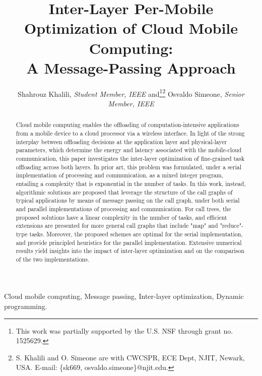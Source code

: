 \documentclass[journal,twocolumn,10pt,twoside]{IEEEtranTCOM}
\theoremstyle{plain}
\theoremstyle{plain}
\theoremstyle{remark}
\begin{document}
\title{Inter-Layer Per-Mobile Optimization of Cloud Mobile Computing: \protect\\ A Message-Passing Approach}


\author{Shahrouz Khalili, \emph{Student Member, IEEE} and\thanks{This work was partially supported by the U.S. NSF through grant no. 1525629.}\thanks{S. Khalili and  O. Simeone are with CWCSPR, ECE Dept, NJIT, Newark, USA. E-mail: \{sk669, osvaldo.simeone\}@njit.edu.} Osvaldo Simeone, \emph{Senior Member, IEEE}}

\maketitle
\vspace{-1in}

\begin{abstract}
Cloud mobile computing enables the offloading of computation-intensive applications from a mobile device to a cloud processor via a wireless interface. In light of the strong interplay between offloading decisions at the application layer and physical-layer parameters, which determine the energy and latency associated with the mobile-cloud communication, this paper investigates the inter-layer optimization of fine-grained task offloading across both layers. In prior art, this problem was formulated, under a serial implementation of processing and communication, as a mixed integer program, entailing a complexity that is exponential in the number of tasks. In this work, instead, algorithmic solutions are proposed that leverage the structure of the call graphs of typical applications by means of message passing on the call graph, under both serial and parallel implementations of processing and communication. For call trees, the proposed solutions have a linear complexity in the number of tasks, and efficient extensions are presented for more general call graphs that include "map" and "reduce"-type tasks. Moreover, the proposed schemes are optimal for the serial implementation, and provide principled heuristics for the parallel implementation. Extensive numerical results yield insights into the impact of inter-layer optimization and on the comparison of the two implementations.
\end{abstract}

\begin{IEEEkeywords}
Cloud mobile computing, Message passing, Inter-layer optimization, Dynamic programming.
\end{IEEEkeywords}
\end{document}
